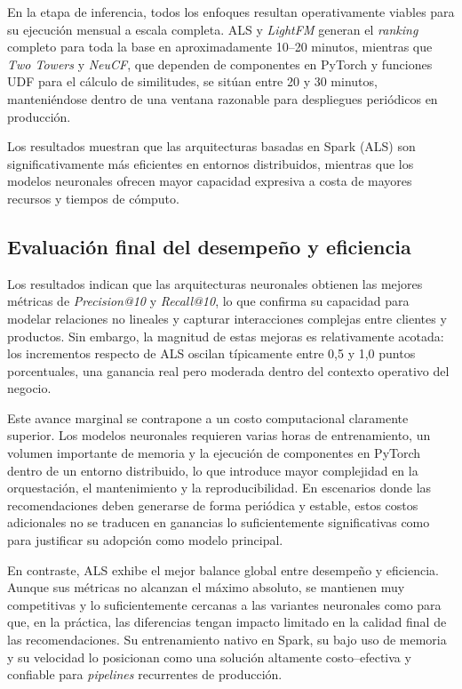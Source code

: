 En la etapa de inferencia, todos los enfoques resultan operativamente viables para su ejecución mensual a escala completa.  
ALS y \textit{LightFM} generan el \textit{ranking} completo para toda la base en aproximadamente 10–20 minutos, mientras que \textit{Two Towers} y \textit{NeuCF}, que dependen de componentes en PyTorch y funciones UDF para el cálculo de similitudes, se sitúan entre 20 y 30 minutos, manteniéndose dentro de una ventana razonable para despliegues periódicos en producción.

Los resultados muestran que las arquitecturas basadas en Spark (ALS) son significativamente más eficientes en entornos distribuidos, mientras que los modelos neuronales ofrecen mayor capacidad expresiva a costa de mayores recursos y tiempos de cómputo.  

\subsection{Evaluación final del desempeño y eficiencia}

Los resultados indican que las arquitecturas neuronales obtienen las mejores métricas de \textit{Precision@10} y \textit{Recall@10}, lo que confirma su capacidad para modelar relaciones no lineales y capturar interacciones complejas entre clientes y productos. Sin embargo, la magnitud de estas mejoras es relativamente acotada: los incrementos respecto de ALS oscilan típicamente entre 0{,}5 y 1{,}0 puntos porcentuales, una ganancia real pero moderada dentro del contexto operativo del negocio.

Este avance marginal se contrapone a un costo computacional claramente superior. Los modelos neuronales requieren varias horas de entrenamiento, un volumen importante de memoria y la ejecución de componentes en PyTorch dentro de un entorno distribuido, lo que introduce mayor complejidad en la orquestación, el mantenimiento y la reproducibilidad. En escenarios donde las recomendaciones deben generarse de forma periódica y estable, estos costos adicionales no se traducen en ganancias lo suficientemente significativas como para justificar su adopción como modelo principal.

En contraste, ALS exhibe el mejor balance global entre desempeño y eficiencia. Aunque sus métricas no alcanzan el máximo absoluto, se mantienen muy competitivas y lo suficientemente cercanas a las variantes neuronales como para que, en la práctica, las diferencias tengan impacto limitado en la calidad final de las recomendaciones. Su entrenamiento nativo en Spark, su bajo uso de memoria y su velocidad lo posicionan como una solución altamente costo–efectiva y confiable para \textit{pipelines} recurrentes de producción.

